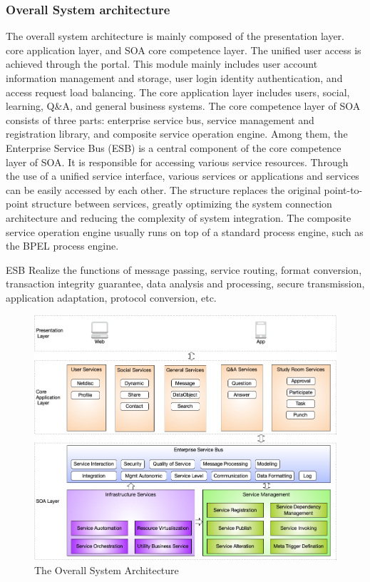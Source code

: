 \documentclass[runningheads]{llncs}
\begin{document}
\subsubsection{Overall System architecture}
\noindent 
The overall system architecture is mainly composed of the presentation layer. core application layer, and SOA core competence layer. The unified user access is achieved through the portal. This module mainly includes user account information management and storage, user login identity authentication, and access request load balancing. The core application layer includes users, social, learning, Q\&A, and general business systems. The core competence layer of SOA consists of three parts: enterprise service bus, service management and registration library, and composite service operation engine. Among them, the Enterprise Service Bus (ESB) is a central component of the core competence layer of SOA. It is responsible for accessing various service resources. Through the use of a unified service interface, various services or applications and services can be easily accessed by each other. The structure replaces the original point-to-point structure between services, greatly optimizing the system connection architecture and reducing the complexity of system integration. The composite service operation engine usually runs on top of a standard process engine, such as the BPEL process engine.    

ESB Realize the functions of message passing, service routing, format conversion, transaction integrity guarantee, data analysis and processing, secure transmission, application adaptation, protocol conversion, etc.
\begin{figure}[H]
  \centering %
  \includegraphics[width=1.0\textwidth]{figure/MWZH/odesb} %
  \caption{The Overall System Architecture} %
  \label{fig11}
\end{figure}
\end{document}
